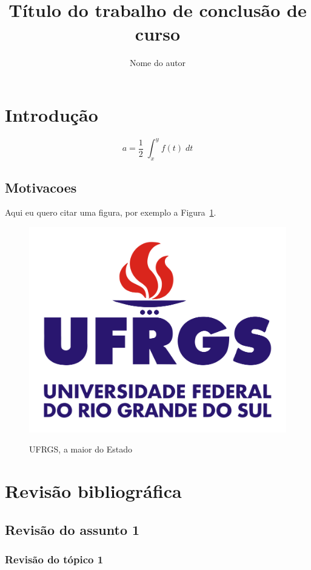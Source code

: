 \documentclass{automatex}
\title{Título do trabalho de conclusão de curso}
\author{Nome do autor}
\begin{document}
\maketitle

\setcounter{page}{1}
\tableofcontents
\newpage

\section{Introdução}
\setcounter{page}{1}

\lipsum[1-2]
\begin{equation}
  a = \dfrac{1}{2}\;\int_x^y f(t)\; dt
\end{equation}

\lipsum[24-26]

\subsection{Motivacoes}

Aqui eu quero citar uma figura, por exemplo a Figura~\ref{fig:ufrgs}.

\begin{figure}[h]
  \centering
  \includegraphics[width=.5\textwidth]{imagens/logo_ufrgs}
  \label{fig:ufrgs}
  \caption{UFRGS, a maior do Estado}
\end{figure}

\newpage

\section{Revisão bibliográfica}

\lipsum[10]

\subsection{Revisão do assunto 1}

\lipsum[11]

\subsubsection{Revisão do tópico 1}

\lipsum[12]
\end{document}
